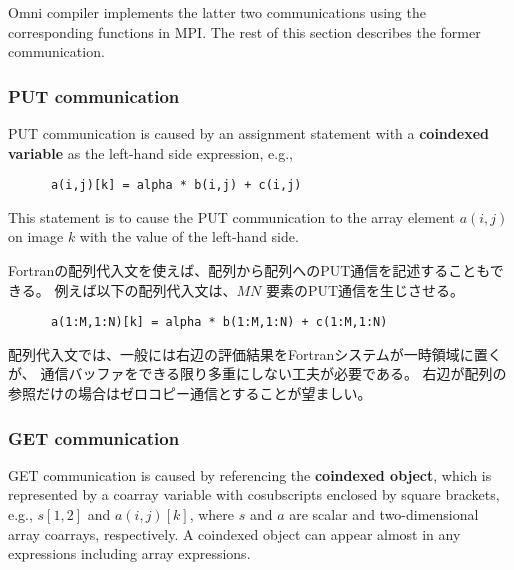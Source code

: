 Omni compiler implements the latter two communications using the corresponding 
functions in MPI. The rest of this section describes the former communication.

\subsubsection{PUT communication}\label{sec:spec-put}

PUT communication is caused by an assignment statement with a {\bf coindexed variable} 
as the left-hand side expression, e.g.,
\begin{verbatim}
      a(i,j)[k] = alpha * b(i,j) + c(i,j)
\end{verbatim}
This statement is to cause the PUT communication to the array element $a(i,j)$ on image $k$
with the value of the left-hand side.

Fortranの配列代入文を使えば、配列から配列へのPUT通信を記述することもできる。
例えば以下の配列代入文は、$M N$ 要素のPUT通信を生じさせる。
\begin{verbatim}
      a(1:M,1:N)[k] = alpha * b(1:M,1:N) + c(1:M,1:N)
\end{verbatim}

\requirement
配列代入文では、一般には右辺の評価結果をFortranシステムが一時領域に置くが、
通信バッファをできる限り多重にしない工夫が必要である。
右辺が配列の参照だけの場合はゼロコピー通信とすることが望ましい。



\subsubsection{GET communication}\label{sec:spec-get}

GET communication is caused by referencing the {\bf coindexed object}, 
which is represented by a coarray variable with cosubscripts enclosed by square brackets, 
e.g., $s[1,2]$ and $a(i,j)[k]$, where $s$ and $a$ are scalar and two-dimensional array 
coarrays, respectively.
%
A coindexed object can appear almost in any expressions including array expressions.

